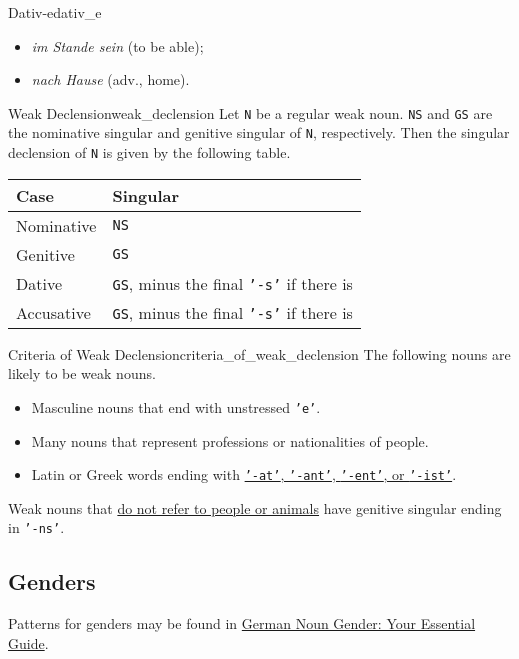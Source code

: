 \documentclass{article}
\begin{document}
\begin{example}{Dativ-e}{dativ_e}
    \begin{itemize}
        \item \textit{im Stande sein} (to be able);
        \item \textit{nach Hause} (adv., home).
    \end{itemize}
\end{example}

\begin{theorem}{Weak Declension}{weak_declension}
    Let \texttt{N} be a regular weak noun.
    \texttt{NS} and \texttt{GS} are the nominative singular and genitive singular of \texttt{N}, respectively.
    Then the singular declension of \texttt{N} is given by the following table.
    \begin{longtable}{ll}
        \toprule
        Case & Singular  \\
        \midrule
        Nominative & \texttt{NS} \\
        Genitive & \texttt{GS} \\
        Dative & \texttt{GS}, minus the final \texttt{'-s'} if there is \\
        Accusative & \texttt{GS}, minus the final \texttt{'-s'} if there is \\
        \bottomrule
    \end{longtable}
\end{theorem}

\begin{proposition}{Criteria of Weak Declension}{criteria_of_weak_declension}
    The following nouns are likely to be weak nouns.
    \begin{itemize}
        \item Masculine nouns that end with unstressed \texttt{'e'}.
        \item Many nouns that represent professions or nationalities of people.
        \item Latin or Greek words ending with \href{https://www.germanveryeasy.com/m/noun-declension}{\texttt{'-at'}, \texttt{'-ant'}, \texttt{'-ent'}, or \texttt{'-ist'}}.
    \end{itemize}
    Weak nouns that \href{https://www.vistawide.com/german/grammar/german_nouns03.htm}{do not refer to people or animals} have genitive singular ending in \texttt{'-ns'}.
\end{proposition}

\subsection{Genders}

Patterns for genders may be found in \href{https://germanwithlaura.com/noun-gender/}{German Noun Gender: Your Essential Guide}.

% 
% 
\end{document}
